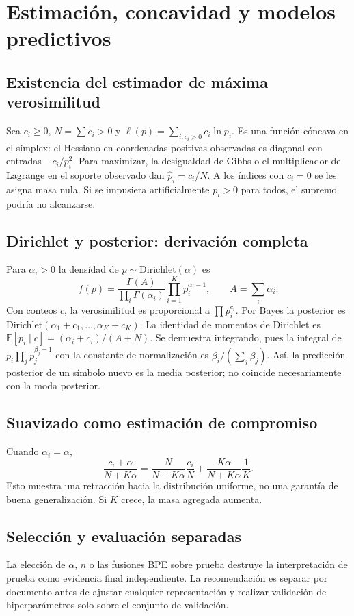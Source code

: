 \chapter{Estimación, concavidad y modelos predictivos}
\section{Existencia del estimador de máxima verosimilitud}
Sea $c_i\ge0$, $N=\sum c_i>0$ y
$\ell(p)=\sum_{i:c_i>0}c_i\ln p_i$. Es una función cóncava en el
símplex: el Hessiano en coordenadas positivas observadas es diagonal con
entradas $-c_i/p_i^2$. Para maximizar, la desigualdad de Gibbs o el
multiplicador de Lagrange en el soporte observado dan
$\widehat p_i=c_i/N$. A los índices con $c_i=0$ se les asigna masa nula.
Si se impusiera artificialmente $p_i>0$ para todos, el supremo podría no alcanzarse.
\section{Dirichlet y posterior: derivación completa}
Para $\alpha_i>0$ la densidad de $p\sim\mathrm{Dirichlet}(\alpha)$ es
\[
f(p)=\frac{\Gamma(A)}{\prod_i\Gamma(\alpha_i)}
\prod_{i=1}^Kp_i^{\alpha_i-1},\qquad A=\sum_i\alpha_i.
\]
Con conteos $c$, la verosimilitud es proporcional a $\prod p_i^{c_i}$.
Por Bayes la posterior es Dirichlet$(\alpha_1+c_1,\ldots,\alpha_K+c_K)$.
La identidad de momentos de Dirichlet es
$\mathbb E[p_i\mid c]=(\alpha_i+c_i)/(A+N)$.
Se demuestra integrando, pues la integral de $p_i\prod_j p_j^{\beta_j-1}$
con la constante de normalización es $\beta_i/(\sum_j\beta_j)$.
Así, la predicción posterior de un símbolo nuevo es la media posterior;
no coincide necesariamente con la moda posterior.
\section{Suavizado como estimación de compromiso}
Cuando $\alpha_i=\alpha$,
\[
\frac{c_i+\alpha}{N+K\alpha}
=\frac{N}{N+K\alpha}\frac{c_i}{N}+
\frac{K\alpha}{N+K\alpha}\frac1K.
\]
Esto muestra una retracción hacia la distribución uniforme, no una garantía
de buena generalización. Si $K$ crece, la masa agregada aumenta.
\section{Selección y evaluación separadas}
La elección de $\alpha$, $n$ o las fusiones BPE sobre prueba destruye la
interpretación de prueba como evidencia final independiente. La recomendación
es separar por documento antes de ajustar cualquier representación y realizar
validación de hiperparámetros solo sobre el conjunto de validación.

